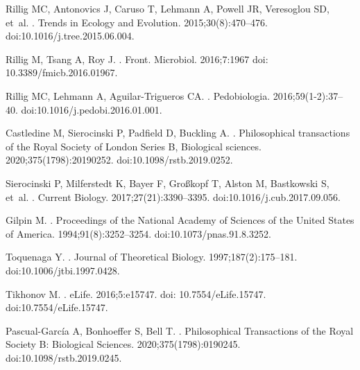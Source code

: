 \documentclass[10pt,letterpaper]{article}
\begin{document}
\begin{thebibliography}{10}
Rillig MC, Antonovics J, Caruso T, Lehmann A, Powell JR, Veresoglou SD, et~al.
.
\newblock Trends in Ecology and Evolution. 2015;30(8):470--476.
\newblock doi:{10.1016/j.tree.2015.06.004}.

Rillig M, Tsang A, Roy J.
.
\newblock Front. Microbiol. 2016;7:1967
\newblock doi: {10.3389/fmicb.2016.01967}.

Rillig MC, Lehmann A, Aguilar-Trigueros CA.
.
\newblock Pedobiologia. 2016;59(1-2):37--40.
\newblock doi:{10.1016/j.pedobi.2016.01.001}.

Castledine M, Sierocinski P, Padfield D, Buckling A.
.
\newblock Philosophical transactions of the Royal Society of London Series B, Biological sciences. 2020;375(1798):20190252.
\newblock doi:{10.1098/rstb.2019.0252}.

Sierocinski P, Milferstedt K, Bayer F, Gro{\ss}kopf T, Alston M, Bastkowski S, et~al.
.
\newblock Current Biology. 2017;27(21):3390--3395.
\newblock doi:{10.1016/j.cub.2017.09.056}.

Gilpin M.
.
\newblock Proceedings of the National Academy of Sciences of the United States of America. 1994;91(8):3252--3254.
\newblock doi:{10.1073/pnas.91.8.3252}.

Toquenaga Y.
.
\newblock Journal of Theoretical Biology. 1997;187(2):175--181.
\newblock doi:{10.1006/jtbi.1997.0428}.

Tikhonov M.
.
\newblock eLife. 2016;5:e15747. doi: 10.7554/eLife.15747.
\newblock doi:{10.7554/eLife.15747}.

Pascual-Garc{\'{i}}a A, Bonhoeffer S, Bell T.
.
\newblock Philosophical Transactions of the Royal Society B: Biological Sciences. 2020;375(1798):0190245.
\newblock doi:{10.1098/rstb.2019.0245}.


\end{thebibliography}
\end{document}
